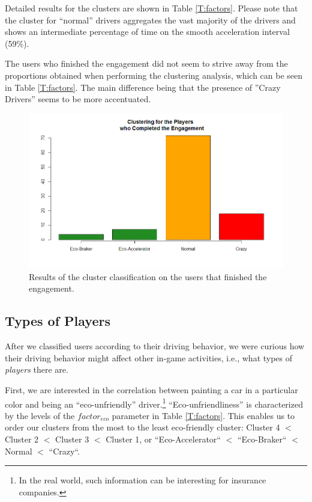 \documentclass[preprint,authoryear,12pt]{elsarticle}
\begin{document}
Detailed results for the clusters are shown in Table \ref{T:factors}.
Please note that the cluster for ``normal'' drivers aggregates the vast majority of the drivers and shows an intermediate percentage of time on the smooth acceleration interval (59\%).

The users who finished the engagement did not seem to strive away from the proportions obtained when performing the clustering analysis, which can be seen in Table \ref{T:factors}. The main difference being that the presence of ''Crazy Drivers'' seems to be more accentuated.

\begin{figure}[tb]
	\begin{center}
		\includegraphics[width=1\linewidth]{ijhcs14-img/Rplot01}
		\caption{Results of the cluster classification on the users that finished the engagement. \label{fig:clusteringengagement}}
	\end{center}
\end{figure}

\subsection{Types of Players}

After we classified users according to their driving behavior, we were curious how their driving behavior might affect other in-game activities, i.e., what types of {\em players\/} there are.

First, we are interested in the correlation between painting a car in a particular color and being an ``eco-unfriendly'' driver.\footnote{In the real world, such information can be interesting for insurance companies.}
``Eco-unfriendliness'' is characterized by the levels of the $factor_{eco}$ parameter in Table \ref{T:factors}. This enables us to order our clusters from the most to the least eco-friendly cluster: Cluster 4 $<$ Cluster 2 $<$ Cluster 3 $<$ Cluster 1, or ``Eco-Accelerator``  $<$ ``Eco-Braker`` $<$  Normal $<$ ``Crazy``.
\end{document}
